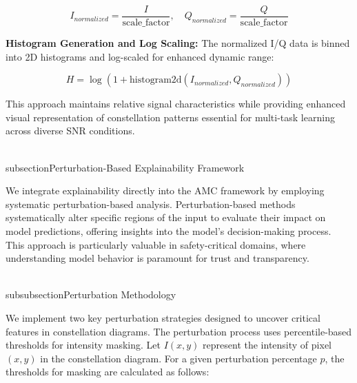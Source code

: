 \documentclass{ELSP}
\begin{document}
\begin{equation}
I_{normalized} = \frac{I}{\text{scale\_factor}}, \quad Q_{normalized} = \frac{Q}{\text{scale\_factor}}
\end{equation}

\textbf{Histogram Generation and Log Scaling:} The normalized I/Q data is binned into 2D histograms and log-scaled for enhanced dynamic range:

\begin{equation}
H = \log(1 + \text{histogram2d}(I_{normalized}, Q_{normalized}))
\end{equation}

This approach maintains relative signal characteristics while providing enhanced visual representation of constellation patterns essential for multi-task learning across diverse SNR conditions.

\\subsection{Perturbation-Based Explainability Framework}

We integrate explainability directly into the AMC framework by employing systematic perturbation-based analysis. Perturbation-based methods systematically alter specific regions of the input to evaluate their impact on model predictions, offering insights into the model's decision-making process. This approach is particularly valuable in safety-critical domains, where understanding model behavior is paramount for trust and transparency.

\\subsubsection{Perturbation Methodology}

We implement two key perturbation strategies designed to uncover critical features in constellation diagrams. The perturbation process uses percentile-based thresholds for intensity masking. Let $I(x,y)$ represent the intensity of pixel $(x,y)$ in the constellation diagram. For a given perturbation percentage $p$, the thresholds for masking are calculated as follows:
\end{document}
